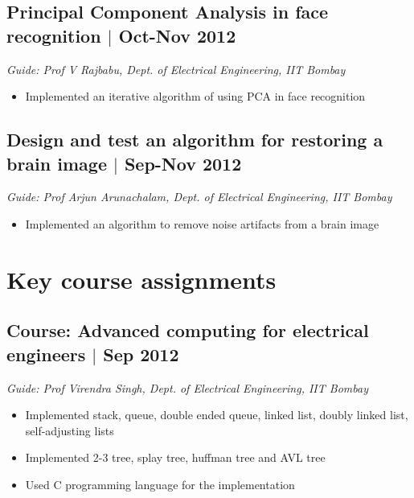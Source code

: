 \documentclass[11pt]{article}
\begin{document}
\subsection*{Principal Component Analysis in face recognition $\vert$  Oct-Nov 2012} 
\emph{Guide: Prof V Rajbabu, Dept. of Electrical Engineering, IIT Bombay}  
\begin{itemize}
\item Implemented an iterative algorithm of using PCA in face recognition  
\end{itemize}

\subsection*{Design and test an algorithm for restoring a brain image $\vert$  Sep-Nov 2012}
\emph{Guide: Prof Arjun Arunachalam, Dept. of Electrical Engineering, IIT Bombay}  
\begin{itemize}
\item Implemented an algorithm to remove noise artifacts from a brain image  
\end{itemize}




\section*{Key course assignments}

\subsection*{Course: Advanced computing for electrical engineers $\vert$ Sep 2012}
\emph{Guide: Prof Virendra Singh, Dept. of Electrical Engineering, IIT Bombay}
\begin{itemize}
\item Implemented stack, queue, double ended queue, linked list, doubly linked list, self-adjusting lists
\item Implemented 2-3 tree, splay tree,  huffman tree and AVL tree
\item Used C programming language for the implementation
\end{itemize}
\end{document}
